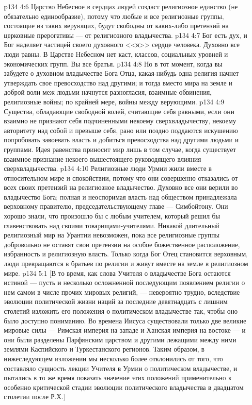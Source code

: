 \vs p134 4:6 Царство Небесное в сердцах людей создаст религиозное единство (не обязательно единообразие), потому что любые и все религиозные группы, состоящие из таких верующих, будут свободны от каких\hyp{}либо претензий на церковные прерогативы --- от религиозного владычества.
\vs p134 4:7 Бог есть дух, и Бог наделяет частицей своего духовного <<я>> сердце человека. Духовно все люди равны. В Царстве Небесном нет каст, классов, социальных уровней и экономических групп. Вы все братья.
\vs p134 4:8 Но в тот момент, когда вы забудете о духовном владычестве Бога Отца, какая\hyp{}нибудь одна религия начнет утверждать свое превосходство над другими; и тогда вместо мира на земле и доброй воли меж людьми начнутся разногласия, взаимные обвинения, религиозные войны; по крайней мере, войны между верующими.
\vs p134 4:9 Существа, обладающие свободной волей, считающие себя равными, если они взаимно не признают себя подчиненными некоему сверхвладычеству, некоему авторитету над собой и превыше себя, рано или поздно поддаются искушению попробовать завоевать власть и добиться превосходства над другими людьми и группами. Идея равенства приносит мир лишь в том случае, когда существует взаимное признание некоего вышестоящего руководящего влияния сверхвладычества.
\vs p134 4:10 Религиозные люди Урмии жили вместе в относительном мире и спокойствии, потому что они совершенно отказались от всех своих претензий на религиозное владычество. Духовно все они верили во владычество Бога; полная и неоспоримая власть над обществом принадлежала верховному правителю, председательствующему главе --- Симбойтону. Они хорошо знали, что произошло бы с любым учителем, который решил бы главенствовать над своими товарищами\hyp{}учителями. Никакой длительный религиозный мир на Урантии невозможен, пока все религиозные группы добровольно не оставят свои претензии на особое божественное расположение, избранность и религиозную власть. Только когда Бог Отец становится верховным, люди превращаются в братьев по религии и живут вместе на земле в религиозном мире.
\vs p134 5:1 [В то время, как слова Учителя о владычестве Бога остаются истиной --- пусть и несколько осложненной последующим появлением религии о нем самом в числе прочих мировых религий, --- невероятно трудно, вследствие эволюции политической жизни наций за последние девятнадцать с лишним столетий изложить его положения о политическом владычестве так, чтобы оно было доступно пониманию. Во времена Иисуса существовали только две великие мировые силы --- Римская империя на западе и Ханская империя на востоке --- и они были разделены Парфянским царством и другими лежащими между ними землями Каспийского и Туркестанского регионов. Таким образом, в нижеследующем изложении мы несколько более отклонились от того, что составляло сущность лекции Учителя в Урмии о политическом владычестве, и пытались в то же время показать значение этих положений применительно к особенно критической стадии эволюции политического владычества в двадцатом столетии после Р.Х.]
